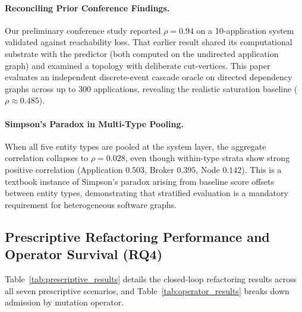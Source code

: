 \paragraph{Reconciling Prior Conference Findings.}
Our preliminary conference study \citep{yigit2025graph} reported $\rho = 0.94$ on a 10-application system validated against reachability loss. That earlier result shared its computational substrate with the predictor (both computed on the undirected application graph) and examined a topology with deliberate cut-vertices. This paper evaluates an independent discrete-event cascade oracle on directed dependency graphs across up to 300 applications, revealing the realistic saturation baseline ($\rho \approx 0.485$).

\paragraph{Simpson's Paradox in Multi-Type Pooling.}
When all five entity types are pooled at the system layer, the aggregate correlation collapses to $\rho = 0.028$, even though within-type strata show strong positive correlation (Application $0.503$, Broker $0.395$, Node $0.142$). This is a textbook instance of Simpson's paradox arising from baseline score offsets between entity types, demonstrating that stratified evaluation is a mandatory requirement for heterogeneous software graphs.

\subsection{Prescriptive Refactoring Performance and Operator Survival (RQ4)}
\label{sec:results:prescriptive}

Table~\ref{tab:prescriptive_results} details the closed-loop refactoring results across all seven prescriptive scenarios, and Table~\ref{tab:operator_results} breaks down admission by mutation operator.

